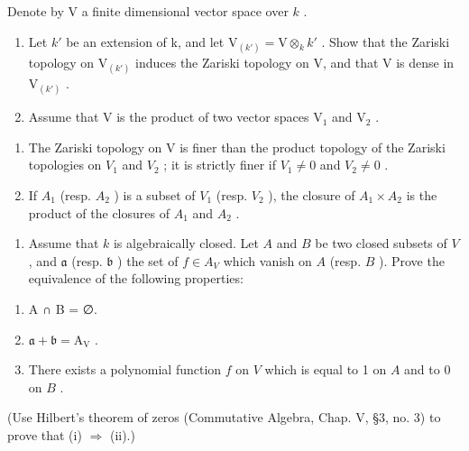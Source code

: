 
Denote by V a finite dimensional vector space over \(k\) .

\begin{enumerate}
\def\labelenumi{\arabic{enumi})}
\item
  Let \(k'\) be an extension of k, and let \(\mathrm{V}_{(k')} = \mathrm{V} \otimes_k k'\) . Show that the Zariski topology on \(\mathrm{V}_{(k')}\) induces the Zariski topology on V, and that V is dense in \(\mathrm{V}_{(k')}\) .
\item
  Assume that \(\mathrm{V}\) is the product of two vector spaces \(\mathrm{V}_1\) and \(\mathrm{V}_2\) .
\end{enumerate}

\begin{enumerate}
\def\labelenumi{\alph{enumi})}
\item
  The Zariski topology on V is finer than the product topology of the Zariski topologies on \(V_{1}\) and \(V_{2}\) ; it is strictly finer if \(V_{1} \neq 0\) and \(V_{2} \neq 0\) .
\item
  If \(A_{1}\) (resp. \(A_{2}\) ) is a subset of \(V_{1}\) (resp. \(V_{2}\) ), the closure of \(A_{1} \times A_{2}\) is the product of the closures of \(A_{1}\) and \(A_{2}\) .
\end{enumerate}

\begin{enumerate}
\def\labelenumi{\arabic{enumi})}
\setcounter{enumi}{2}
\tightlist
\item
  Assume that \(k\) is algebraically closed. Let \(A\) and \(B\) be two closed subsets of \(V\) , and \(\mathfrak{a}\) (resp. \(\mathfrak{b}\) ) the set of \(f \in A_V\) which vanish on \(A\) (resp. \(B\) ). Prove the equivalence of the following properties:
\end{enumerate}

\begin{enumerate}
\def\labelenumi{(\roman{enumi})}
\item
  A ∩ B = ∅.
\item
  \(\mathfrak{a} + \mathfrak{b} = \mathrm{A_V}\) .
\item
  There exists a polynomial function \(f\) on \(V\) which is equal to 1 on \(A\) and to 0 on \(B\) .
\end{enumerate}

(Use Hilbert's theorem of zeros (Commutative Algebra, Chap. V, §3, no. 3) to prove that (i) \(\Longrightarrow\) (ii).)


